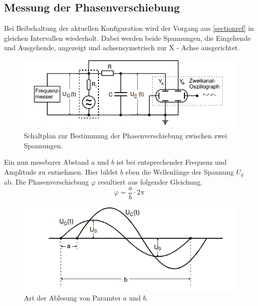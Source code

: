 \subsection{Messung der Phasenverschiebung}
Bei Beibehaltung der aktuellen Konfiguration wird der Vorgang aus \ref{sectionref} in gleichen Intervallen
wiederholt. Dabei werden beide Spannungen, die Eingehende und Ausgehende, angezeigt und achsensymetrisch
zur X - Achse ausgerichtet.\\
\begin{figure}
    \centering 
    \includegraphics[width=\textwidth]{bilder/ab.png}
    \caption{Schaltplan zur Bestimmung der Phasenverschiebung zwischen zwei Spannungen.\cite{skript}}
    \label{fig:ab}
\end{figure} 
Ein nun messbarer Abstand $a$ und $b$ %
ist bei entsprechender Frequenz und Amplitude zu entnehmen. Hier bildet $b$ eben die Wellenlänge
der Spannung $U_g$ ab. Die Phasenverschiebung $\varphi$ resultiert aus folgender Gleichung.
\begin{equation}
    \varphi= \frac{a}{b} \cdot 2 \pi
\end{equation}

\begin{figure}
    \centering
    \includegraphics[width=\textwidth]{bilder/ab2.png}
    \caption{Art der Ablesung von Paramter $a$ und $b$.\cite{skript}}
    \label{fig:ab}
\end{figure}

